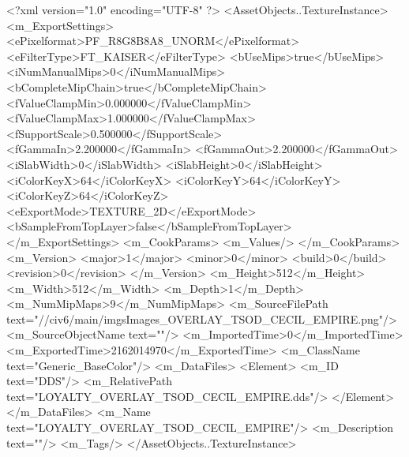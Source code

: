 <?xml version="1.0" encoding="UTF-8" ?>
<AssetObjects..TextureInstance>
	<m_ExportSettings>
		<ePixelformat>PF_R8G8B8A8_UNORM</ePixelformat>
		<eFilterType>FT_KAISER</eFilterType>
		<bUseMips>true</bUseMips>
		<iNumManualMips>0</iNumManualMips>
		<bCompleteMipChain>true</bCompleteMipChain>
		<fValueClampMin>0.000000</fValueClampMin>
		<fValueClampMax>1.000000</fValueClampMax>
		<fSupportScale>0.500000</fSupportScale>
		<fGammaIn>2.200000</fGammaIn>
		<fGammaOut>2.200000</fGammaOut>
		<iSlabWidth>0</iSlabWidth>
		<iSlabHeight>0</iSlabHeight>
		<iColorKeyX>64</iColorKeyX>
		<iColorKeyY>64</iColorKeyY>
		<iColorKeyZ>64</iColorKeyZ>
		<eExportMode>TEXTURE_2D</eExportMode>
		<bSampleFromTopLayer>false</bSampleFromTopLayer>
	</m_ExportSettings>
	<m_CookParams>
		<m_Values/>
	</m_CookParams>
	<m_Version>
		<major>1</major>
		<minor>0</minor>
		<build>0</build>
		<revision>0</revision>
	</m_Version>
	<m_Height>512</m_Height>
	<m_Width>512</m_Width>
	<m_Depth>1</m_Depth>
	<m_NumMipMaps>9</m_NumMipMaps>
	<m_SourceFilePath text="//civ6/main/imgs\Processed Images\LOYALTY_OVERLAY_TSOD_CECIL_EMPIRE.png"/>
	<m_SourceObjectName text=""/>
	<m_ImportedTime>0</m_ImportedTime>
	<m_ExportedTime>2162014970</m_ExportedTime>
	<m_ClassName text="Generic_BaseColor"/>
	<m_DataFiles>
		<Element>
			<m_ID text="DDS"/>
			<m_RelativePath text="LOYALTY_OVERLAY_TSOD_CECIL_EMPIRE.dds"/>
		</Element>
	</m_DataFiles>
	<m_Name text="LOYALTY_OVERLAY_TSOD_CECIL_EMPIRE"/>
	<m_Description text=""/>
	<m_Tags/>
</AssetObjects..TextureInstance>

